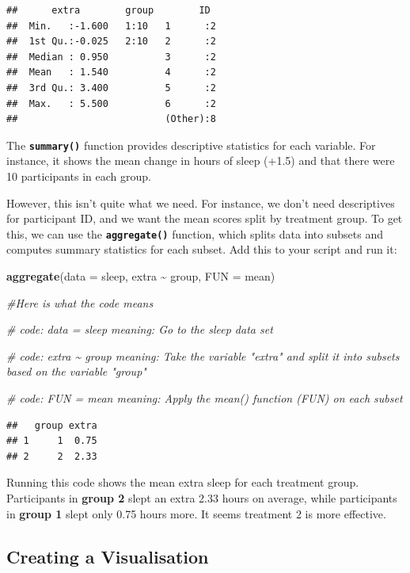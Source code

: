 \documentclass[
]{book}
\newenvironment{Shaded}{\begin{snugshade}}{\end{snugshade}}
\newcommand{\AttributeTok}[1]{\textcolor[rgb]{0.13,0.29,0.53}{#1}}
\newcommand{\CommentTok}[1]{\textcolor[rgb]{0.56,0.35,0.01}{\textit{#1}}}
\newcommand{\FunctionTok}[1]{\textcolor[rgb]{0.13,0.29,0.53}{\textbf{#1}}}
\newcommand{\NormalTok}[1]{#1}
\newcommand{\SpecialCharTok}[1]{\textcolor[rgb]{0.81,0.36,0.00}{\textbf{#1}}}
\begin{document}
\begin{verbatim}
##      extra        group        ID   
##  Min.   :-1.600   1:10   1      :2  
##  1st Qu.:-0.025   2:10   2      :2  
##  Median : 0.950          3      :2  
##  Mean   : 1.540          4      :2  
##  3rd Qu.: 3.400          5      :2  
##  Max.   : 5.500          6      :2  
##                          (Other):8
\end{verbatim}

The \textbf{\texttt{summary()}} function provides descriptive statistics for each variable. For instance, it shows the mean change in hours of sleep (+1.5) and that there were 10 participants in each group.

However, this isn't quite what we need. For instance, we don't need descriptives for participant ID, and we want the mean scores split by treatment group. To get this, we can use the \textbf{\texttt{aggregate()}} function, which splits data into subsets and computes summary statistics for each subset. Add this to your script and run it:

\begin{Shaded}
\begin{Highlighting}[]
\FunctionTok{aggregate}\NormalTok{(}\AttributeTok{data =}\NormalTok{ sleep, extra }\SpecialCharTok{\textasciitilde{}}\NormalTok{ group, }\AttributeTok{FUN =}\NormalTok{ mean)}


\CommentTok{\#Here is what the code means}


\CommentTok{\# code: data = sleep meaning: Go to the sleep data set}

\CommentTok{\# code: extra \textasciitilde{} group meaning: Take the variable "extra" and split it into subsets based on the variable "group"}

\CommentTok{\# code: FUN = mean meaning: Apply the mean() function (FUN) on each subset }
\end{Highlighting}
\end{Shaded}

\begin{verbatim}
##   group extra
## 1     1  0.75
## 2     2  2.33
\end{verbatim}

Running this code shows the mean extra sleep for each treatment group. Participants in \textbf{group 2} slept an extra 2.33 hours on average, while participants in \textbf{group 1} slept only 0.75 hours more. It seems treatment 2 is more effective.

\subsection{Creating a Visualisation}\label{creating-a-visualisation}
\end{document}
